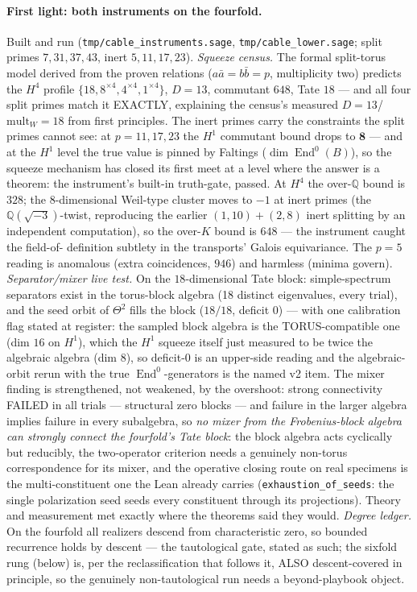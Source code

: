\documentclass[11pt]{article}
\theoremstyle{definition}
\theoremstyle{remark}
\begin{document}
\paragraph{First light: both instruments on the fourfold.}  Built and
run (\texttt{tmp/cable\_instruments.sage},
\texttt{tmp/cable\_lower.sage}; split primes $7,31,37,43$, inert
$5,11,17,23$).  \emph{Squeeze census.}  The formal split-torus model
derived from the proven relations ($a\bar a=b\bar b=p$, multiplicity
two) predicts the $H^4$ profile $\{18,8^{\times4},4^{\times4},
1^{\times4}\}$, $D=13$, commutant $648$, Tate $18$ --- and all four
split primes match it EXACTLY, explaining the census's measured
$D=13$/$\mathrm{mult}_W=18$ from first principles.  The inert primes
carry the constraints the split primes cannot see: at $p=11,17,23$
the $H^1$ commutant bound drops to $\mathbf{8}$ --- and at the $H^1$
level the true value is pinned by Faltings ($\dim\operatorname{End}^0
(B)$), so the squeeze mechanism has closed its first meet at a level
where the answer is a theorem: the instrument's built-in truth-gate,
passed.  At $H^4$ the over-$\mathbb{Q}$ bound is $328$; the
$8$-dimensional Weil-type cluster moves to $-1$ at inert primes
(the $\mathbb{Q}(\sqrt{-3})$-twist, reproducing the earlier
$(1,10)+(2,8)$ inert splitting by an independent computation), so the
over-$K$ bound is $648$ --- the instrument caught the field-of-
definition subtlety in the transports' Galois equivariance.  The
$p=5$ reading is anomalous (extra coincidences, $946$) and harmless
(minima govern).  \emph{Separator/mixer live test.}  On the
$18$-dimensional Tate block: simple-spectrum separators exist in the
torus-block algebra (18 distinct eigenvalues, every trial), and the
seed orbit of $\Theta^2$ fills the block ($18/18$, deficit $0$) ---
with one calibration flag stated at register: the sampled block
algebra is the TORUS-compatible one (dim $16$ on $H^1$), which the
$H^1$ squeeze itself just measured to be twice the algebraic algebra
(dim $8$), so deficit-$0$ is an upper-side reading and the
algebraic-orbit rerun with the true $\operatorname{End}^0$-generators
is the named v2 item.  The mixer finding is strengthened, not
weakened, by the overshoot: strong connectivity FAILED in all trials
--- structural zero blocks --- and failure in the larger algebra
implies failure in every subalgebra, so \emph{no mixer from the
Frobenius-block algebra can strongly connect the fourfold's Tate
block}: the block algebra acts cyclically but reducibly, the
two-operator criterion needs a genuinely non-torus correspondence for
its mixer, and the operative closing route on real specimens is the
multi-constituent one the Lean already carries
(\texttt{exhaustion\_of\_seeds}: the single polarization seed seeds
every constituent through its projections).  Theory and measurement
met exactly where the theorems said they would.  \emph{Degree
ledger.}  On the fourfold all realizers descend from characteristic
zero, so bounded recurrence holds by descent --- the tautological
gate, stated as such; the sixfold rung (below) is, per the
reclassification that follows it, ALSO descent-covered in principle,
so the genuinely non-tautological run needs a beyond-playbook object.
\end{document}
